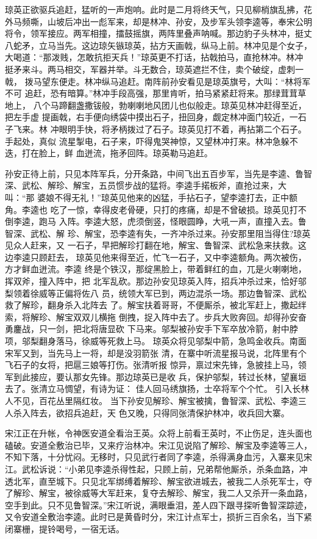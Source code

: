 琼英正欲驱兵追赶，猛听的一声炮响。此时是二月将终天气，只见柳梢旗乱拂，花
外马频嘶，山坡后冲出一彪军来，却是林冲、孙安，及步军头领李逵等，奉宋公明
将令，领军接应。两军相撞，擂鼓摇旗，两阵里叠声呐喊。那边豹子头林冲，挺丈
八蛇矛，立马当先。这边琼矢镞琼英，拈方天画戟，纵马上前。林冲见是个女子，
大喝道：“那泼贱，怎敢抗拒天兵！”琼英更不打话，拈戟拍马，直抢林冲。林冲
挺矛来斗。两马相交，军器并举。斗无数合，琼英遮拦不住，卖个破绽，虚刺一戟，
拨马望东便走。林冲纵马追赶。南阵前孙安看见是琼英旗号，大叫：“林将军不可
追赶，恐有暗算。”林冲手段高强，那里肯听，拍马紧紧赶将来。那绿茸茸草地上，
八个马蹄翻盏撒钹般，勃喇喇地风团儿也似般走。琼英见林冲赶得至近，把左手虚
提画戟，右手便向绣袋中摸出石子，扭回身，觑定林冲面门较近，一石子飞来。林
冲眼明手快，将矛柄拨过了石子。琼英见打不着，再拈第二个石子。手起处，真似
流星掣电，石子来，吓得鬼哭神惊，又望林冲打来。林冲急躲不迭，打在脸上，鲜
血迸流，拖矛回阵。琼英勒马追赶。

孙安正待上前，只见本阵军兵，分开条路，中间飞出五百步军，当先是李逵、鲁智
深、武松、解珍、解宝，五员惯步战的猛将。李逵手掿板斧，直抢过来，大叫：“那
婆娘不得无礼！”琼英见他来的凶猛，手拈石子，望李逵打去，正中额角。李逵也
吃了一惊，幸得皮老骨硬，只打的疼痛，却是不曾破损。琼英见打不倒李逵，跑马
入阵。李逵大怒，虎须倒竖，怪眼圆睁，大吼一声，直撞入去。鲁智深、武松、解
珍、解宝，恐李逵有失，一齐冲杀过来。孙安那里阻当得住?琼英见众人赶来，又
一石子，早把解珍打翻在地，解宝、鲁智深、武松急来扶救。这边李逵只顾赶去，
琼英见他来得至近，忙飞一石子，又中李逵额角。两次被伤，方才鲜血迸流。李逵
终是个铁汉，那绽黑脸上，带着鲜红的血，兀是火喇喇地，挥双斧，撞入阵中，把
北军乱砍。那边孙安见琼英入阵，招兵冲杀过来，恰好邬梨领着徐威等正偏将佐八
员，统领大军已到，两边混杀一场。那边鲁智深、武松救了解珍，翻身杀入北阵去
了。解宝扶着哥哥，不便厮杀，被北军赶上，撒起绊索，将解珍、解宝双双儿横拖
倒拽，捉入阵中去了。步兵大败奔回。却得孙安奋勇鏖战，只一剑，把北将唐显砍
下马来。邬梨被孙安手下军卒放冷箭，射中脖项，邬梨翻身落马，徐威等死救上马。
琼英众将见邬梨中箭，急鸣金收兵。南面宋军又到，当先马上一将，却是没羽箭张
清，在寨中听流星报马说，北阵里有个飞石子的女将，把扈三娘等打伤。张清听报
惊异，禀过宋先锋，急披挂上马，领军到此接应，要认那女先锋。那边琼英已是收
兵，保护邬梨，转过长林，望襄垣去了。张清立马惆望，有诗为证：
佳人回马绣旗扬，士卒将军个个忙。
引入长林人不见，百花丛里隔红妆。
当下孙安见解珍、解宝被擒，鲁智深、武松、李逵三人杀入阵去，欲招兵追赶，天
色又晚，只得同张清保护林冲，收兵回大寨。

宋江正在升帐，令神医安道全看治王英。众将上前看王英时，不止伤足，连头面也
磕破。安道全敷治已毕，又来疗治林冲。宋江见说陷了解珍、解宝及李逵等三人，
不知下落，十分忧闷。无移时，只见武行者同了李逵，杀得满身血污，入寨来见宋
江。武松诉说：“小弟见李逵杀得性起，只顾上前，兄弟帮他厮杀，杀条血路，冲
透北军，直至城下。只见北军绑缚着解珍、解宝欲进城去，被我二人杀死军士，夺
了解珍、解宝，被徐威等大军赶来，复夺去解珍、解宝，我二人又杀开一条血路，
空手到此。只不见鲁智深。”宋江听说，满眼垂泪，差人四下跟寻探听鲁智深踪迹，
又令安道全敷治李逵。此时已是黄昏时分，宋江计点军士，损折三百余名，当下紧
闭寨栅，提铃喝号，一宿无话。


